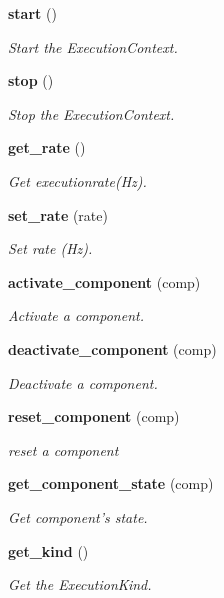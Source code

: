 \begin{CompactItemize}
{\bf start} ()
\begin{CompactList}\small\item\em Start the Execution\-Context. \item\end{CompactList}\item 
{\bf stop} ()
\begin{CompactList}\small\item\em Stop the Execution\-Context. \item\end{CompactList}\item 
{\bf get\_\-rate} ()
\begin{CompactList}\small\item\em Get executionrate(Hz). \item\end{CompactList}\item 
{\bf set\_\-rate} (rate)
\begin{CompactList}\small\item\em Set rate (Hz). \item\end{CompactList}\item 
{\bf activate\_\-component} (comp)
\begin{CompactList}\small\item\em Activate a component. \item\end{CompactList}\item 
{\bf deactivate\_\-component} (comp)
\begin{CompactList}\small\item\em Deactivate a component. \item\end{CompactList}\item 
{\bf reset\_\-component} (comp)
\begin{CompactList}\small\item\em reset a component \item\end{CompactList}\item 
{\bf get\_\-component\_\-state} (comp)
\begin{CompactList}\small\item\em Get component's state. \item\end{CompactList}\item 
{\bf get\_\-kind} ()
\begin{CompactList}\small\item\em Get the Execution\-Kind. \item\end{CompactList}\item 

\end{CompactItemize}
